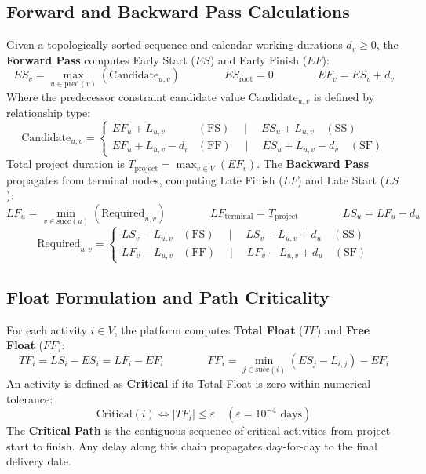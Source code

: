 \subsection{Forward and Backward Pass Calculations}
Given a topologically sorted sequence and calendar working durations $d_v \ge 0$, the \textbf{Forward Pass} computes Early Start ($ES$) and Early Finish ($EF$):
$$
    ES_v = \max_{u \in \text{pred}(v)} (\text{Candidate}_{u,v}) \qquad \qquad ES_{\text{root}} = 0 \qquad \qquad EF_v = ES_v + d_v
$$
Where the predecessor constraint candidate value $\text{Candidate}_{u,v}$ is defined by relationship type:
$$
    \text{Candidate}_{u,v} = \begin{cases}
        EF_u + L_{u,v} & (\text{FS}) \quad \mid \quad ES_u + L_{u,v} \quad (\text{SS}) \\
        EF_u + L_{u,v} - d_v & (\text{FF}) \quad \mid \quad ES_u + L_{u,v} - d_v \quad (\text{SF})
    \end{cases}
$$
Total project duration is $T_{\text{project}} = \max_{v \in V} (EF_v)$. The \textbf{Backward Pass} propagates from terminal nodes, computing Late Finish ($LF$) and Late Start ($LS$):
$$
    LF_u = \min_{v \in \text{succ}(u)} (\text{Required}_{u,v}) \qquad \qquad LF_{\text{terminal}} = T_{\text{project}} \qquad \qquad LS_u = LF_u - d_u
$$
$$
    \text{Required}_{u,v} = \begin{cases}
        LS_v - L_{u,v} & (\text{FS}) \quad \mid \quad LS_v - L_{u,v} + d_u \quad (\text{SS}) \\
        LF_v - L_{u,v} & (\text{FF}) \quad \mid \quad LF_v - L_{u,v} + d_u \quad (\text{SF})
    \end{cases}
$$

\vspace{4mm}

\subsection{Float Formulation and Path Criticality}
For each activity $i \in V$, the platform computes \textbf{Total Float} ($TF$) and \textbf{Free Float} ($FF$):
$$
    TF_i = LS_i - ES_i = LF_i - EF_i \qquad \qquad FF_i = \min_{j \in \text{succ}(i)} \left( ES_j - L_{i,j} \right) - EF_i
$$
An activity is defined as \textbf{Critical} if its Total Float is zero within numerical tolerance:
$$
    \text{Critical}(i) \iff |TF_i| \le \varepsilon \quad (\varepsilon = 10^{-4} \text{ days})
$$
The \textbf{Critical Path} is the contiguous sequence of critical activities from project start to finish. Any delay along this chain propagates day-for-day to the final delivery date.

